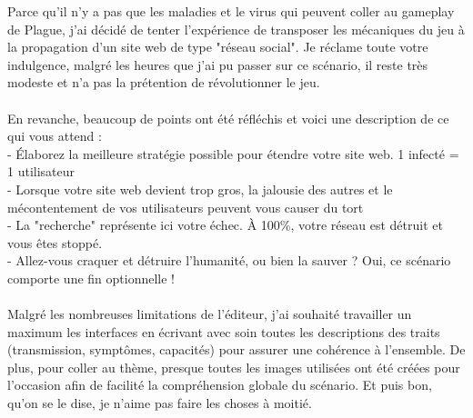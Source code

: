 \documentclass[10pt,a4paper]{article}
\begin{document}
Parce qu'il n'y a pas que les maladies et le virus qui peuvent coller au gameplay de Plague, j'ai décidé de tenter l'expérience de transposer les mécaniques du jeu à la propagation d'un site web de type "réseau social". Je réclame toute votre indulgence, malgré les heures que j'ai pu passer sur ce scénario, il reste très modeste et n'a pas la prétention de révolutionner le jeu.\\
\\
En revanche, beaucoup de points ont été réfléchis et voici une description de ce qui vous attend :\\
- Élaborez la meilleure stratégie possible pour étendre votre site web. 1 infecté = 1 utilisateur\\
- Lorsque votre site web devient trop gros, la jalousie des autres et le mécontentement de vos utilisateurs peuvent vous causer du tort\\
- La "recherche" représente ici votre échec. À 100\%, votre réseau est détruit et vous êtes stoppé.\\
- Allez-vous craquer et détruire l'humanité, ou bien la sauver ? Oui, ce scénario comporte une fin optionnelle !\\
\\
Malgré les nombreuses limitations de l'éditeur, j'ai souhaité travailler un maximum les interfaces en écrivant avec soin toutes les descriptions des traits (transmission, symptômes, capacités) pour assurer une cohérence à l'ensemble. De plus, pour coller au thème, presque toutes les images utilisées ont été créées pour l'occasion afin de facilité la compréhension globale du scénario. Et puis bon, qu'on se le dise, je n'aime pas faire les choses à moitié.\\
\end{document}
